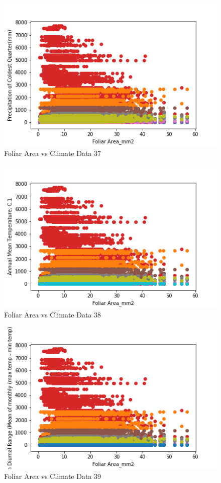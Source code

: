 \documentclass[letterpaper]{article}
\begin{document}
\begin{figure}[h]
\caption{Foliar Area vs Climate Data 37\label{fig:Foliar_Area_vs_37}}
\centering
\includegraphics[width=0.7\paperwidth]{Foliar_Area_vs_37}
\end{figure}


\begin{figure}[h]
\caption{Foliar Area vs Climate Data 38\label{fig:Foliar_Area_vs_38}}
\centering
\includegraphics[width=0.7\paperwidth]{Foliar_Area_vs_38}
\end{figure}


\begin{figure}[h]
\caption{Foliar Area vs Climate Data 39\label{fig:Foliar_Area_vs_39}}
\centering
\includegraphics[width=0.7\paperwidth]{Foliar_Area_vs_39}
\end{figure}
\end{document}

